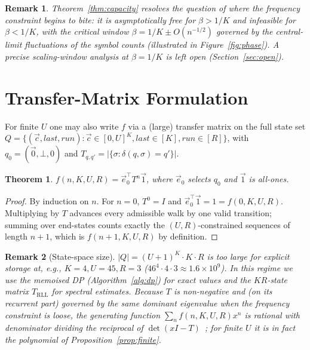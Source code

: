 \documentclass[a4paper,12pt]{article}
\newtheorem{theorem}{Theorem}
\newtheorem{remark}{Remark}
\begin{document}
\begin{remark}
Theorem~\ref{thm:capacity} resolves the question of where the
frequency constraint begins to bite: it is asymptotically free for
$\beta>1/K$ and infeasible for $\beta<1/K$, with the critical window
$\beta=1/K\pm O(n^{-1/2})$ governed by the central-limit fluctuations
of the symbol counts (illustrated in Figure~\ref{fig:phase}).  A
precise scaling-window analysis at $\beta=1/K$ is left open
(Section~\ref{sec:open}).
\end{remark}

\section{Transfer-Matrix Formulation}
\label{sec:transfer}

For finite $U$ one may also write $f$ via a (large) transfer matrix on
the full state set $Q=\{(\vec{c},last,run):\vec{c}\in[0,U]^K,
last\in[K],run\in[R]\}$, with $q_0=(\vec{0},\bot,0)$ and
$T_{q,q'}=|\{\sigma:\delta(q,\sigma)=q'\}|$.

\begin{theorem}\label{thm:matrix}
$f(n,K,U,R)=\vec{e}_0^\top T^n\vec{1}$, where $\vec{e}_0$ selects $q_0$
and $\vec{1}$ is all-ones.
\end{theorem}

\begin{proof}
By induction on $n$. For $n=0$, $T^0=I$ and
$\vec{e}_0^\top\vec{1}=1=f(0,K,U,R)$. Multiplying by $T$ advances every
admissible walk by one valid transition; summing over end-states
counts exactly the $(U,R)$-constrained sequences of length $n+1$,
which is $f(n+1,K,U,R)$ by definition.
\end{proof}

\begin{remark}[State-space size]
$|Q|=(U+1)^K\cdot K\cdot R$ is too large for explicit storage at, e.g.,
$K=4,U=45,R=3$ ($46^4\cdot4\cdot3\approx1.6\times10^9$).  In this
regime we use the memoised DP (Algorithm~\ref{alg:dp}) for exact
values and the $KR$-state matrix $T_{\mathrm{RLL}}$ for spectral
estimates.  Because $T$ is non-negative and (on its recurrent part)
governed by the same dominant eigenvalue when the frequency constraint
is loose, the generating function
$\sum_n f(n,K,U,R)x^n$ is rational with denominator dividing the
reciprocal of $\det(xI-T)$~\cite{flajolet2009}; for finite $U$ it is in
fact the polynomial of Proposition~\ref{prop:finite}.
\end{remark}
\end{document}
